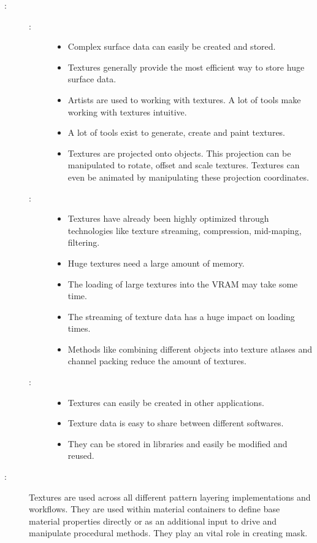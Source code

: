 \begin{description}
	\item[\patConsequences:]\hfill 
		\begin{description}
			\item[\visual:]\hfill
			\begin{itemize}\mynobreakpar
				\item Complex surface data can easily be created and stored.
				\item Textures generally provide the most efficient way to store huge surface data. 
				\item Artists are used to working with textures. A lot of tools make working with textures intuitive. 
				\item A lot of tools exist to generate, create and paint textures.
				\item Textures are projected onto objects. This projection can be manipulated to rotate, offset and scale textures. Textures can even be animated by manipulating these projection coordinates. 
			\end{itemize}
			\item[\performance:]\hfill
			\begin{itemize}\mynobreakpar
				\item Textures have already been highly optimized through technologies like texture streaming, compression, mid-maping, filtering.
				\item Huge textures need a large amount of memory. 
				\item The loading of large textures into the VRAM may take some time. 
				\item The streaming of texture data has a huge impact on loading times.   
				\item Methods like combining different objects into texture atlases and channel packing reduce the amount of textures.  
			\end{itemize}
			\item[\pipeline:]\hfill
			\begin{itemize}\mynobreakpar
				\item Textures can easily be created in other applications.
				\item Texture data is easy to share between different softwares.
				\item They can be stored in libraries and easily be modified and reused.
			\end{itemize}
		\end{description}
	\item[\patRelations:]%
	Textures are used across all different pattern layering implementations and workflows. They are used within material containers to define base material properties directly or as an additional input to drive and manipulate procedural methods. They play an vital role in creating mask. 
\end{description}



